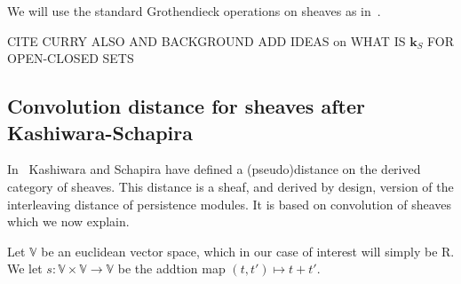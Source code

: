 \documentclass[a4paper, english, 11pt]{article}
\newcommand{\kk}[0]{\textbf{k}}
\newcommand{\0}{\vec{0}}
\newcommand{\V}[0]{\mathbb{V}}
\newcommand{\Rr}[0]{\text{R}}
\begin{document}
We will use the standard Grothendieck operations on sheaves as in~\cite{Kash90}.  
 
 CITE CURRY ALSO AND BACKGROUND ADD IDEAS on WHAT IS $\kk_S $ FOR OPEN-CLOSED SETS
 
\subsection{Convolution distance for sheaves after Kashiwara-Schapira}
In~\cite{KS18} Kashiwara and Schapira have defined a (pseudo)distance on the derived category of sheaves. This distance is a sheaf, and derived by design, version of the interleaving distance of persistence modules. It is based on convolution of sheaves which we now explain. 

Let  $\V$  be an euclidean vector space, which in our case of interest will simply be $\Rr$. We let $s: \V\times \V \to \V$ be the addtion map $(t,t')\mapsto t+t'$.  
\end{document}
